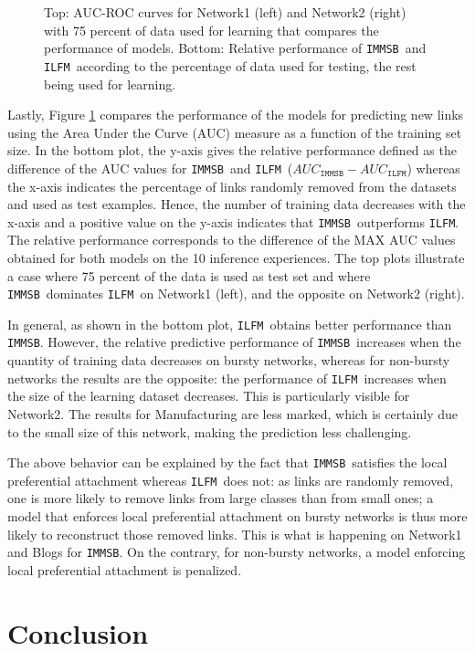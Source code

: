 \documentclass[conference]{IEEEtran}
\newcommand{\ifm}{\texttt{ILFM}}
\newcommand{\imb}{\texttt{IMMSB}}
\begin{document}
\begin{figure}[h]
\begin{minipage}{0.5\textwidth}
    \end{minipage}
    \caption{Top: AUC-ROC curves for Network1 (left) and Network2 (right) with 75 percent of data used for learning that compares the performance of models. Bottom: Relative performance of \imb\ and \ifm\ according to the percentage of data used for testing, the rest being used for learning.} 
\label{fig:auc}
\end{figure}

Lastly, Figure \ref{fig:auc} compares the performance of the models for predicting new links using the Area Under the Curve (AUC) measure as a function of the training set size. In the bottom plot, the y-axis gives the relative performance defined as the difference of the AUC values for \imb\ and \ifm\ ($AUC_{\imb} - AUC_{\ifm}$) whereas the x-axis indicates the percentage of links randomly removed from the datasets and used as test examples. Hence, the number of training data decreases with the x-axis and a positive value on the y-axis indicates that \imb\ outperforms \ifm.  The relative performance corresponds to the difference of the MAX AUC values obtained for both models on the 10 inference experiences. The top plots illustrate a case where 75 percent of the data is used as test set and where \imb\ dominates \ifm\ on Network1 (left), and the opposite on Network2 (right).

In general, as shown in the bottom plot, \ifm\ obtains better performance than \imb. However, the relative predictive performance of \imb\  increases  when the quantity of training data decreases on bursty networks, whereas for non-bursty networks the results are the opposite: the performance of \ifm\ increases when the size of the learning dataset decreases. This is particularly visible for Network2. The results for Manufacturing are less marked, which is certainly due to the small size of this network, making the prediction less challenging.

The above behavior can be explained by the fact that \imb\ satisfies the local preferential attachment whereas \ifm\ does not: as links are randomly removed, one is more likely to remove links from large classes than from small ones; a model that enforces local preferential attachment on bursty networks is thus more likely to reconstruct those removed links. This is what is happening on Network1 and Blogs for \imb. On the contrary, for non-bursty networks, a model enforcing local preferential attachment is penalized.

\section{Conclusion}
\label{sec:concl}
\end{document}
